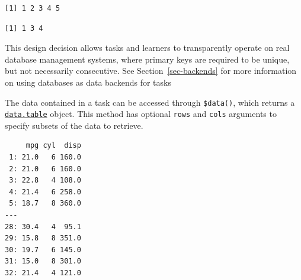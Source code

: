 \begin{verbatim}
[1] 1 2 3 4 5
\end{verbatim}

\begin{Shaded}
\begin{Highlighting}[]
\SpecialCharTok{$}\NormalTok{(}\NormalTok{(}\NormalTok{, }\NormalTok{, }\NormalTok{))}
\SpecialCharTok{$}
\end{Highlighting}
\end{Shaded}

\begin{verbatim}
[1] 1 3 4
\end{verbatim}

This design decision allows tasks and learners to transparently operate
on real database management systems, where primary keys are required to
be unique, but not necessarily consecutive. See
Section~\ref{sec-backends} for more information on using databases as
data backends for tasks

The data contained in a task can be accessed through \texttt{\$data()},
which returns a
\href{https://www.rdocumentation.org/packages/data.table/topics/data.table-package}{\texttt{data.table}}
object. This method has optional \texttt{rows} and \texttt{cols}
arguments to specify subsets of the data to retrieve.

\begin{Shaded}
\begin{Highlighting}[]
\SpecialCharTok{$}\NormalTok{()}
\end{Highlighting}
\end{Shaded}

\begin{verbatim}
     mpg cyl  disp
 1: 21.0   6 160.0
 2: 21.0   6 160.0
 3: 22.8   4 108.0
 4: 21.4   6 258.0
 5: 18.7   8 360.0
---               
28: 30.4   4  95.1
29: 15.8   8 351.0
30: 19.7   6 145.0
31: 15.0   8 301.0
32: 21.4   4 121.0
\end{verbatim}

\begin{Shaded}
\begin{Highlighting}[]
\SpecialCharTok{$}\NormalTok{(} \NormalTok{(}\NormalTok{, }\NormalTok{, }\NormalTok{), }\SpecialCharTok{$}
\end{Highlighting}
\end{Shaded}

